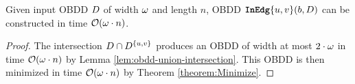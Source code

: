 \begin{proposition}\label{introedgetime}
    Given input OBDD $D$ of width $\omega$ and length $n$, OBDD $\texttt{\textbf{InEdg}}\{u,v\}(b, D)$ can be constructed in time $\mathcal{O}(\omega \cdot n)$.
\end{proposition}
\begin{proof}
    The intersection $D \cap D^{\{u,v\}}$ produces an OBDD of width at most $2\cdot \omega$ in time $\mathcal{O}(\omega \cdot n)$ by Lemma \ref{lem:obdd-union-intersection}. This OBDD is then minimized in time $\mathcal{O}(\omega \cdot n)$ by Theorem \ref{theorem:Minimize}.
\end{proof}
 


